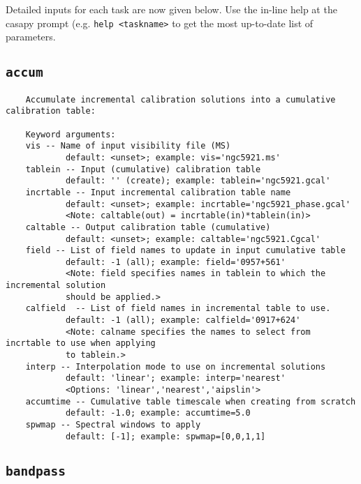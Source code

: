Detailed inputs for each task are now given below.  Use the in-line
help at the casapy prompt (e.g. {\tt help <taskname>} to get the
most up-to-date list of parameters.

\subsection{{\tt accum}}
\label{section:tasks.accum}

\small
\begin{verbatim}
    Accumulate incremental calibration solutions into a cumulative calibration table:
    
    Keyword arguments:
    vis -- Name of input visibility file (MS)
            default: <unset>; example: vis='ngc5921.ms'
    tablein -- Input (cumulative) calibration table 
            default: '' (create); example: tablein='ngc5921.gcal'
    incrtable -- Input incremental calibration table name
            default: <unset>; example: incrtable='ngc5921_phase.gcal'
            <Note: caltable(out) = incrtable(in)*tablein(in)>
    caltable -- Output calibration table (cumulative)
            default: <unset>; example: caltable='ngc5921.Cgcal'
    field -- List of field names to update in input cumulative table 
            default: -1 (all); example: field='0957+561'
            <Note: field specifies names in tablein to which the incremental solution
            should be applied.>
    calfield  -- List of field names in incremental table to use.
            default: -1 (all); example: calfield='0917+624'
            <Note: calname specifies the names to select from incrtable to use when applying
            to tablein.>
    interp -- Interpolation mode to use on incremental solutions
            default: 'linear'; example: interp='nearest'
            <Options: 'linear','nearest','aipslin'>
    accumtime -- Cumulative table timescale when creating from scratch
            default: -1.0; example: accumtime=5.0
    spwmap -- Spectral windows to apply
            default: [-1]; example: spwmap=[0,0,1,1]
\end{verbatim}
\normalsize


\subsection{{\tt bandpass}}
\label{section:tasks.bandpass}

